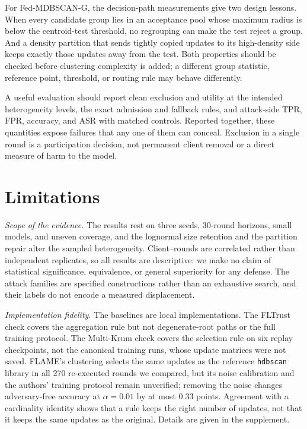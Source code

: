 \documentclass[journal]{IEEEtran}
\newcommand{\method}{Fed-MDBSCAN-G}
\begin{document}
For \method{}, the decision-path measurements give two design lessons. When every candidate group lies in an acceptance pool whose maximum radius is below the centroid-test threshold, no regrouping can make the test reject a group. And a density partition that sends tightly copied updates to its high-density side keeps exactly those updates away from the test. Both properties should be checked before clustering complexity is added; a different group statistic, reference point, threshold, or routing rule may behave differently.

A useful evaluation should report clean exclusion and utility at the intended heterogeneity levels, the exact admission and fallback rules, and attack-side TPR, FPR, accuracy, and ASR with matched controls. Reported together, these quantities expose failures that any one of them can conceal. Exclusion in a single round is a participation decision, not permanent client removal or a direct measure of harm to the model.

\section{Limitations}\label{sec:limits}
\emph{Scope of the evidence.} The results rest on three seeds, 30-round horizons, small models, and uneven coverage, and the lognormal size retention and the partition repair alter the sampled heterogeneity. Client--rounds are correlated rather than independent replicates, so all results are descriptive: we make no claim of statistical significance, equivalence, or general superiority for any defense. The attack families are specified constructions rather than an exhaustive search, and their labels do not encode a measured displacement.

\emph{Implementation fidelity.} The baselines are local implementations. The FLTrust check covers the aggregation rule but not degenerate-root paths or the full training protocol. The Multi-Krum check covers the selection rule on six replay checkpoints, not the canonical training runs, whose update matrices were not saved. FLAME's clustering selects the same updates as the reference \texttt{hdbscan} library in all 270 re-executed rounds we compared, but its noise calibration and the authors' training protocol remain unverified; removing the noise changes adversary-free accuracy at $\alpha=0.01$ by at most 0.33 points. Agreement with a cardinality identity shows that a rule keeps the right number of updates, not that it keeps the same updates as the original. Details are given in the supplement.
\end{document}
